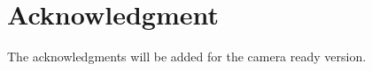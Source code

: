 \documentclass[10pt, conference]{IEEEtran}
\begin{document}
\section*{Acknowledgment}

The acknowledgments will be added for the camera ready version.




%
%
%






\end{document}
